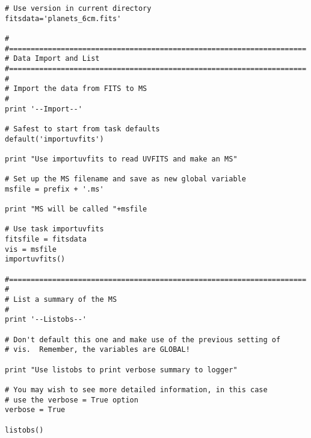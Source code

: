 \begin{verbatim}
# Use version in current directory
fitsdata='planets_6cm.fits'

#
#=====================================================================
# Data Import and List
#=====================================================================
#
# Import the data from FITS to MS
#
print '--Import--'

# Safest to start from task defaults
default('importuvfits')

print "Use importuvfits to read UVFITS and make an MS"

# Set up the MS filename and save as new global variable
msfile = prefix + '.ms'

print "MS will be called "+msfile

# Use task importuvfits
fitsfile = fitsdata
vis = msfile
importuvfits()

#=====================================================================
#
# List a summary of the MS
#
print '--Listobs--'

# Don't default this one and make use of the previous setting of
# vis.  Remember, the variables are GLOBAL!

print "Use listobs to print verbose summary to logger"

# You may wish to see more detailed information, in this case
# use the verbose = True option
verbose = True

listobs()


\end{verbatim}
